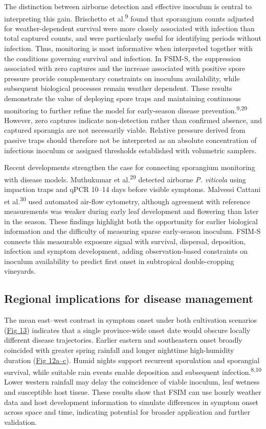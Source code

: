 \documentclass{article}
\begin{document}
The distinction between airborne detection and effective inoculum is central
to interpreting this gain. Brischetto et al.\textsuperscript{9} found that
sporangium counts adjusted for weather-dependent survival were more closely
associated with infection than total captured counts, and were particularly
useful for identifying periods without infection. Thus, monitoring is most
informative when interpreted together with the conditions governing survival
and infection. In FSIM-S, the suppression associated with zero captures and
the increase associated with positive spore pressure provide complementary
constraints on inoculum availability, while subsequent biological processes
remain weather dependent. These results demonstrate the value of deploying
spore traps and maintaining continuous monitoring to further refine the
model for early-season disease prevention.\textsuperscript{9,29} However,
zero captures indicate non-detection rather than confirmed absence, and
captured sporangia are not necessarily viable. Relative pressure derived
from passive traps should therefore not be interpreted as an absolute
concentration of infectious inoculum or assigned thresholds established with
volumetric samplers.

Recent developments strengthen the case for connecting sporangium
monitoring with disease models. Muthukumar et al.\textsuperscript{29} detected
airborne \emph{P. viticola} using impaction traps and qPCR 10--14 days
before visible symptoms. Malvessi Cattani et al.\textsuperscript{30} used automated
air-flow cytometry, although agreement with reference measurements was
weaker during early leaf development and flowering than later in the
season. These findings highlight both the opportunity for earlier
biological information and the difficulty of measuring sparse
early-season inoculum. FSIM-S connects this measurable exposure signal
with survival, dispersal, deposition, infection and symptom development,
adding observation-based constraints on inoculum availability to predict
first onset in subtropical double-cropping vineyards.

\subsection{Regional implications for disease management}
\label{regional-implications-for-disease-management}

The mean east--west contrast in symptom onset under both cultivation
scenarios (\hyperref[_Ref223011563]{Fig 13}) indicates that a single
province-wide onset date would obscure locally different disease
trajectories. Earlier eastern and southeastern onset broadly coincided with
greater spring rainfall and longer nighttime high-humidity duration
(\hyperref[fig:spring-weather-background]{Fig 12a--c}). Humid nights support
recurrent sporulation and sporangial survival, while suitable rain events
enable deposition and subsequent infection.\textsuperscript{8,10} Lower
western rainfall may delay the coincidence of viable inoculum, leaf wetness
and susceptible host tissue. These results show that FSIM can use hourly
weather data and host development information to simulate differences in
symptom onset across space and time, indicating potential for broader
application and further validation.
\end{document}

